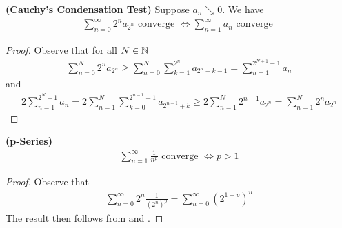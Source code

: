 \documentclass{report}
\begin{document}
\begin{theorem}
\label{Cauchy's Condensation Test}
\textbf{(Cauchy's Condensation Test)} Suppose $a_n\searrow 0$. We have 
\begin{align*}
\sum_{n=0}^{\infty} 2^na_{2^n}\text{ converge }\iff \sum_{n=1}^{\infty}a_n\text{ converge }
\end{align*}
\end{theorem}
\begin{proof}
Observe that for all $N\in\mathbb{N}$ 
\begin{align*}
\sum_{n=0}^N 2^n a_{2^n}\geq \sum_{n=0}^N \sum_{k=1}^{2^n} a_{2^n+k-1} =\sum_{n=1}^{2^{N+1}-1}a_n
\end{align*}
and
\begin{align*}
 2\sum_{n=1}^{2^N-1} a_n= 2\sum_{n=1}^N \sum_{k=0}^{2^{n-1}-1}a_{2^{n-1}+k}\geq 2\sum_{n=1}^N 2^{n-1} a_{2^n}=\sum_{n=1}^N 2^na_{2^n}
\end{align*}
\end{proof}
\begin{theorem}
\label{p-Series}
\textbf{(p-Series)}
\begin{align*}
\sum_{n=1}^{\infty} \frac{1}{n^p}\text{ converge }\iff p>1
\end{align*}
\end{theorem}
\begin{proof}
Observe that
\begin{align*}
\sum_{n=0}^{\infty} 2^n \frac{1}{(2^n)^p}=\sum_{n=0}^{\infty}(2^{1-p})^n
\end{align*}
The result then follows from   and . 
\end{proof}
\end{document}
